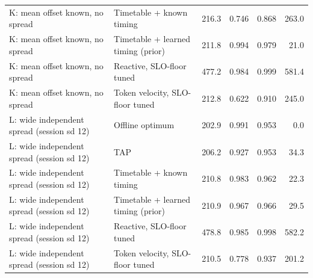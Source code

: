 \begin{tabular}{@{}llrrrr@{}}
K: mean offset known, no spread & Timetable + known timing & 216.3 & 0.746 & 0.868 & 263.0 \\
K: mean offset known, no spread & Timetable + learned timing (prior) & 211.8 & 0.994 & 0.979 & 21.0 \\
K: mean offset known, no spread & Reactive, SLO-floor tuned & 477.2 & 0.984 & 0.999 & 581.4 \\
K: mean offset known, no spread & Token velocity, SLO-floor tuned & 212.8 & 0.622 & 0.910 & 245.0 \\
L: wide independent spread (session sd 12) & Offline optimum & 202.9 & 0.991 & 0.953 & 0.0 \\
L: wide independent spread (session sd 12) & TAP & 206.2 & 0.927 & 0.953 & 34.3 \\
L: wide independent spread (session sd 12) & Timetable + known timing & 210.8 & 0.983 & 0.962 & 22.3 \\
L: wide independent spread (session sd 12) & Timetable + learned timing (prior) & 210.9 & 0.967 & 0.966 & 29.5 \\
L: wide independent spread (session sd 12) & Reactive, SLO-floor tuned & 478.8 & 0.985 & 0.998 & 582.2 \\
L: wide independent spread (session sd 12) & Token velocity, SLO-floor tuned & 210.5 & 0.778 & 0.937 & 201.2 \\
\bottomrule
\end{tabular}
